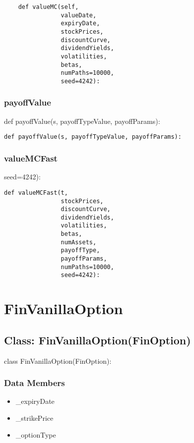 \documentclass[twoside,11pt]{book}
\begin{document}
\begin{lstlisting}
    def valueMC(self,
                valueDate,
                expiryDate,
                stockPrices,
                discountCurve,
                dividendYields,
                volatilities,
                betas,
                numPaths=10000,
                seed=4242):
\end{lstlisting}

\subsubsection*{{\bf payoffValue}}
def payoffValue(s, payoffTypeValue, payoffParams): 

\begin{lstlisting}
def payoffValue(s, payoffTypeValue, payoffParams):
\end{lstlisting}

\subsubsection*{{\bf valueMCFast}}
seed=4242): 

\begin{lstlisting}
def valueMCFast(t,
                stockPrices,
                discountCurve,
                dividendYields,
                volatilities,
                betas,
                numAssets,
                payoffType,
                payoffParams,
                numPaths=10000,
                seed=4242):
\end{lstlisting}

\newpage
\section{FinVanillaOption}

\subsection*{Class: FinVanillaOption(FinOption)}
class FinVanillaOption(FinOption): 

\subsubsection*{Data Members}
\begin{itemize}
\item{\_expiryDate}
\item{\_strikePrice}
\item{\_optionType}
\end{itemize}
\end{document}
